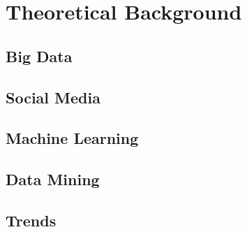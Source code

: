 
\chapter{Theoretical Background}
\label{cha:background}

\section{Big Data}
\label{sec:big-data}


\section{Social Media}
\label{sec:social-media}


\section{Machine Learning}
\label{sec:machine-learning}


\section{Data Mining}
\label{sec:data-mining}


\section{Trends}
\label{sec:trends}
